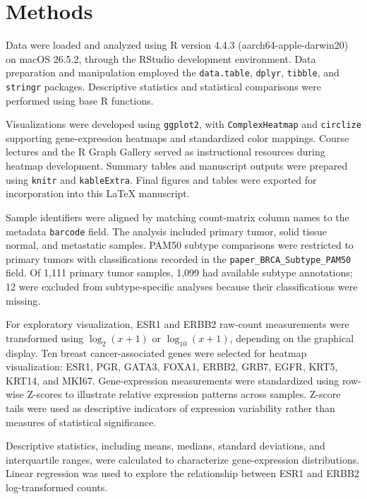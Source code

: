 \documentclass[12pt,letterpaper]{article}
\begin{document}

\section*{Methods}

Data were loaded and analyzed using R version 4.4.3 (aarch64-apple-darwin20) on macOS 26.5.2, through the RStudio development environment. Data preparation and manipulation employed the \texttt{data.table}, \texttt{dplyr}, \texttt{tibble}, and \texttt{stringr} packages. Descriptive statistics and statistical comparisons were performed using base R functions.

Visualizations were developed using \texttt{ggplot2}, with \texttt{ComplexHeatmap} and \texttt{circlize} supporting gene-expression heatmaps and standardized color mappings. Course lectures and the R Graph Gallery served as instructional resources during heatmap development. Summary tables and manuscript outputs were prepared using \texttt{knitr} and \texttt{kableExtra}. Final figures and tables were exported for incorporation into this LaTeX manuscript.

Sample identifiers were aligned by matching count-matrix column names to the metadata \texttt{barcode} field. The analysis included primary tumor, solid tissue normal, and metastatic samples. PAM50 subtype comparisons were restricted to primary tumors with classifications recorded in the \texttt{paper\_BRCA\_Subtype\_PAM50} field. Of 1,111 primary tumor samples, 1,099 had available subtype annotations; 12 were excluded from subtype-specific analyses because their classifications were missing.

For exploratory visualization, ESR1 and ERBB2 raw-count measurements were transformed using $\log_2(x+1)$ or $\log_{10}(x+1)$, depending on the graphical display. Ten breast cancer-associated genes were selected for heatmap visualization: ESR1, PGR, GATA3, FOXA1, ERBB2, GRB7, EGFR, KRT5, KRT14, and MKI67. Gene-expression measurements were standardized using row-wise Z-scores to illustrate relative expression patterns across samples. Z-score tails were used as descriptive indicators of expression variability rather than measures of statistical significance.

Descriptive statistics, including means, medians, standard deviations, and interquartile ranges, were calculated to characterize gene-expression distributions. Linear regression was used to explore the relationship between ESR1 and ERBB2 log-transformed counts.
\end{document}
